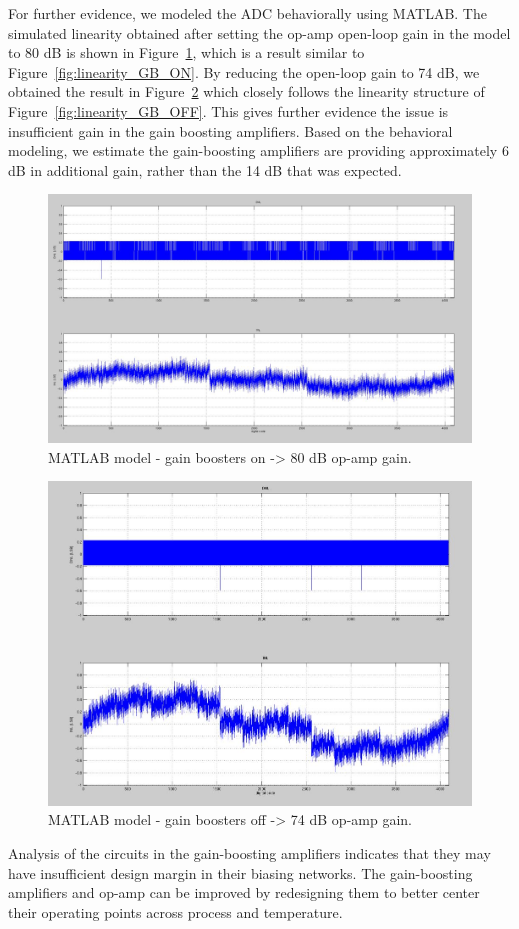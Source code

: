 For further evidence, we modeled the ADC behaviorally using MATLAB. The simulated linearity obtained after setting the op-amp open-loop gain in the model to 80 dB is shown in Figure~\ref{fig:behav_GB_ON}, which is a result similar to Figure~\ref{fig:linearity_GB_ON}. By reducing the open-loop gain to 74 dB, we obtained the result in Figure~\ref{fig:behav_GB_OFF} which closely follows the linearity structure of Figure~\ref{fig:linearity_GB_OFF}. This gives further evidence the issue is insufficient gain in the gain boosting amplifiers. Based on the behavioral modeling, we estimate the gain-boosting amplifiers are providing approximately 6 dB in additional gain, rather than the 14 dB that was expected.
\begin{figure}[h!]
\centering
  \includegraphics[width=0.7\linewidth]{figures/prakash_fig/behav_GB_ON.JPG}
  \caption{MATLAB model - gain boosters on -> 80 dB op-amp gain.}
  \label{fig:behav_GB_ON}
\end{figure}

\begin{figure}[h!]
\centering
  \includegraphics[width=0.7\linewidth]{figures/prakash_fig/behav_GB_OFF.JPG}
  \caption{MATLAB model - gain boosters off -> 74 dB op-amp gain.}
  \label{fig:behav_GB_OFF}
\end{figure}
Analysis of the circuits in the gain-boosting amplifiers indicates that they may have insufficient design margin in their biasing networks. The gain-boosting amplifiers and op-amp can be improved by redesigning them to better center their operating points across process and temperature.

